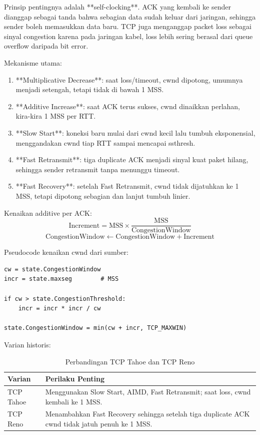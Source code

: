 Prinsip pentingnya adalah **self-clocking**. ACK yang kembali ke sender dianggap sebagai tanda bahwa sebagian data sudah keluar dari jaringan, sehingga sender boleh memasukkan data baru. TCP juga menganggap packet loss sebagai sinyal congestion karena pada jaringan kabel, loss lebih sering berasal dari queue overflow daripada bit error.

Mekanisme utama:
\begin{enumerate}
    \item **Multiplicative Decrease**: saat loss/timeout, cwnd dipotong, umumnya menjadi setengah, tetapi tidak di bawah 1 MSS.
    \item **Additive Increase**: saat ACK terus sukses, cwnd dinaikkan perlahan, kira-kira 1 MSS per RTT.
    \item **Slow Start**: koneksi baru mulai dari cwnd kecil lalu tumbuh eksponensial, menggandakan cwnd tiap RTT sampai mencapai ssthresh.
    \item **Fast Retransmit**: tiga duplicate ACK menjadi sinyal kuat paket hilang, sehingga sender retransmit tanpa menunggu timeout.
    \item **Fast Recovery**: setelah Fast Retransmit, cwnd tidak dijatuhkan ke 1 MSS, tetapi dipotong sebagian dan lanjut tumbuh linier.
\end{enumerate}

Kenaikan additive per ACK:
\[
    \text{Increment}
    =
    \text{MSS}\times\frac{\text{MSS}}{\text{CongestionWindow}}
\]
\[
    \text{CongestionWindow}
    \leftarrow
    \text{CongestionWindow}+\text{Increment}
\]

Pseudocode kenaikan cwnd dari sumber:
\begin{lstlisting}[caption={Pseudocode kenaikan CongestionWindow}, label={lst:cwnd-increase}]
cw = state.CongestionWindow
incr = state.maxseg        # MSS

if cw > state.CongestionThreshold:
    incr = incr * incr / cw

state.CongestionWindow = min(cw + incr, TCP_MAXWIN)
\end{lstlisting}

Varian historis:
\begin{table}[H]
\centering
\begin{tabularx}{\textwidth}{|L{0.24\textwidth}|X|}
\hline
\textbf{Varian} & \textbf{Perilaku Penting} \\
\hline
TCP Tahoe & Menggunakan Slow Start, AIMD, Fast Retransmit; saat loss, cwnd kembali ke 1 MSS. \\
\hline
TCP Reno & Menambahkan Fast Recovery sehingga setelah tiga duplicate ACK cwnd tidak jatuh penuh ke 1 MSS. \\
\hline
\end{tabularx}
\caption{Perbandingan TCP Tahoe dan TCP Reno}
\label{tab:tahoe-reno}
\end{table}

